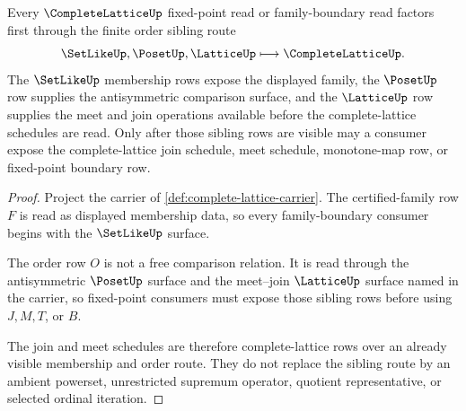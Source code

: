 \begin{theorem}
\label{thm:complete-lattice-order-sibling-route}
Every $\CompleteLatticeUp$ fixed-point read or family-boundary read factors first through the finite order sibling route
$$
\SetLikeUp,\PosetUp,\LatticeUp \longmapsto \CompleteLatticeUp .
$$
The $\SetLikeUp$ membership rows expose the displayed family, the $\PosetUp$ row supplies the antisymmetric comparison surface, and the $\LatticeUp$ row supplies the meet and join operations available before the complete-lattice schedules are read. Only after those sibling rows are visible may a consumer expose the complete-lattice join schedule, meet schedule, monotone-map row, or fixed-point boundary row.
\end{theorem}
\begin{proof}
Project the carrier of \autoref{def:complete-lattice-carrier}. The certified-family row $F$ is read as displayed membership data, so every family-boundary consumer begins with the $\SetLikeUp$ surface.

The order row $O$ is not a free comparison relation. It is read through the antisymmetric $\PosetUp$ surface and the meet--join $\LatticeUp$ surface named in the carrier, so fixed-point consumers must expose those sibling rows before using $J,M,T$, or $B$.

The join and meet schedules are therefore complete-lattice rows over an already visible membership and order route. They do not replace the sibling route by an ambient powerset, unrestricted supremum operator, quotient representative, or selected ordinal iteration.
\end{proof}
